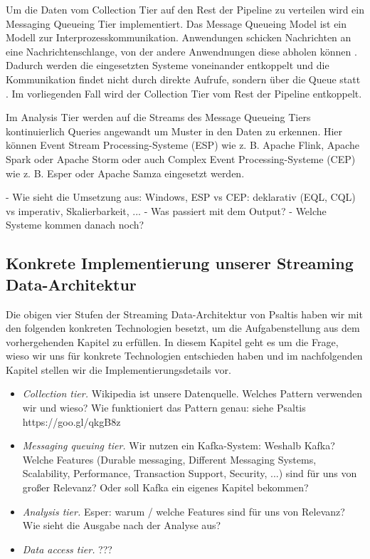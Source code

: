Um die Daten vom Collection Tier auf den Rest der Pipeline zu verteilen wird ein Messaging Queueing Tier implementiert.
Das Message Queueing Model ist ein Modell zur Interprozesskommunikation. Anwendungen schicken
Nachrichten an eine Nachrichtenschlange, von der andere Anwendnungen diese abholen können \cite{gray2003interprocess}.
Dadurch werden die eingesetzten Systeme voneinander entkoppelt und die Kommunikation findet nicht durch direkte Aufrufe,
sondern über die Queue statt \cite{psaltis2017streaming}. Im vorliegenden Fall wird der Collection Tier vom Rest der Pipeline entkoppelt.

Im Analysis Tier werden auf die Streams des Message Queueing Tiers kontinuierlich Queries angewandt um Muster in den Daten zu erkennen.
Hier können Event Stream Processing-Systeme (ESP) wie z. B. Apache Flink, Apache Spark oder Apache Storm  oder
auch Complex Event Processing-Systeme (CEP) wie z. B. Esper oder Apache Samza eingesetzt werden. \cite{psaltis2017streaming}

- Wie sieht die Umsetzung aus: Windows, ESP vs CEP: deklarativ (EQL, CQL) vs imperativ, Skalierbarkeit, ...
- Was passiert mit dem Output?
- Welche Systeme kommen danach noch?

\subsection{Konkrete Implementierung unserer Streaming Data-Architektur}
Die obigen vier Stufen der Streaming Data-Architektur von Psaltis \cite{psaltis2017streaming}
haben wir mit den folgenden konkreten Technologien besetzt, um die Aufgabenstellung aus dem vorhergehenden Kapitel zu erfüllen.
In diesem Kapitel geht es um die Frage, wieso wir uns für konkrete Technologien entschieden haben und im nachfolgenden Kapitel
stellen wir die Implementierungsdetails vor.
\begin{itemize}
    \item \textit{Collection tier.} Wikipedia ist unsere Datenquelle.
    Welches Pattern verwenden wir und wieso? Wie funktioniert das Pattern genau: siehe Psaltis https://goo.gl/qkgB8z
    \item \textit{Messaging queuing tier.} Wir nutzen ein Kafka-System: Weshalb Kafka? Welche Features
    (Durable messaging, Different Messaging Systems, Scalability, Performance, Transaction Support, Security, ...) sind für uns von großer Relevanz?
    Oder soll Kafka ein eigenes Kapitel bekommen?
    \item \textit{Analysis tier.} Esper: warum / welche Features sind für uns von Relevanz? Wie sieht die Ausgabe nach der Analyse aus?
    \item \textit{Data access tier.} ???
\end{itemize}